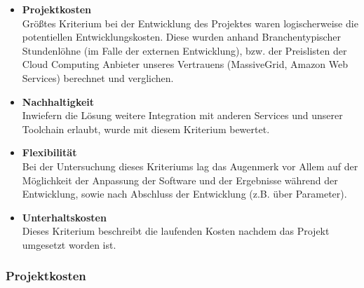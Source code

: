\begin{itemize}
    \item \textbf{Projektkosten}\\
    Größtes Kriterium bei der Entwicklung des Projektes waren logischerweise die
     potentiellen Entwicklungskosten. Diese wurden anhand Branchentypischer Stundenlöhne
     (im Falle der externen Entwicklung), bzw. der Preislisten der Cloud Computing
     Anbieter unseres Vertrauens (MassiveGrid, Amazon Web Services) berechnet und verglichen.

    \item \textbf{Nachhaltigkeit}\\
    Inwiefern die Lösung weitere Integration mit anderen Services und unserer
    Toolchain erlaubt, wurde mit diesem Kriterium bewertet.

    \item \textbf{Flexibilität}\\
    Bei der Untersuchung dieses Kriteriums lag das Augenmerk vor Allem auf der
    Möglichkeit der Anpassung der Software und der Ergebnisse während der Entwicklung,
    sowie nach Abschluss der Entwicklung (z.B. über Parameter).

    \item \textbf{Unterhaltskosten}\\
    Dieses Kriterium beschreibt die laufenden Kosten nachdem das Projekt umgesetzt worden ist.
\end{itemize}



\subsubsection{Projektkosten}

